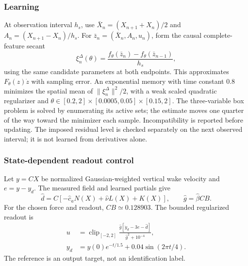\subsubsection{Learning}
At observation interval $h_s$, use
$\bar X_n=(X_{n+1}+X_n)/2$ and $A_n=(X_{n+1}-X_n)/h_s$.
For $\bar z_n=(\bar X_n,A_n,u_n)$, form the causal complete-feature secant
\begin{equation}
 \xi_n^\Delta(\theta)=
 \frac{f_\theta(\bar z_n)-f_\theta(\bar z_{n-1})}{h_s},
 \label{eq:afc_short_secant}
\end{equation}
using the same candidate parameters at both endpoints. This approximates
$F_\theta(z)\dot z$ with sampling error. An exponential memory with time
constant $0.8$ minimizes the spatial mean of
$\|\xi_n^\Delta\|^2/2$, with a weak scaled quadratic regularizer and
$\theta\in[0.2,2]\times[0.0005,0.05]\times[0.15,2]$.
The three-variable box problem is solved by enumerating its active sets;
the estimate moves one quarter of the way toward the minimizer each sample.
Incompatibility is reported before updating. The imposed residual level is
checked separately on the next observed interval; it is not learned from
derivatives alone.

\subsubsection{State-dependent readout control}
Let $y=CX$ be normalized Gaussian-weighted vertical wake velocity and
$e=y-y_d$. The measured field and learned partials give
\begin{equation}
 \hat d=C[-\hat c_aN(X)+\hat\nu L(X)+K(X)],
 \qquad \hat g=\hat\beta CB.
\end{equation}
For the chosen force and readout, $CB\simeq0.128903$. The bounded regularized
readout is
\begin{align}
 u&=\operatorname{clip}_{[-2,2]}
 \frac{\hat g[\dot y_d-3e-\hat d]}{\hat g^2+10^{-4}},
 \label{eq:afc_short_control}
 \\
 y_d&=y(0)e^{-t/1.5}+0.04\sin(2\pi t/4).\nonumber
\end{align}
The reference is an output target, not an identification label.

